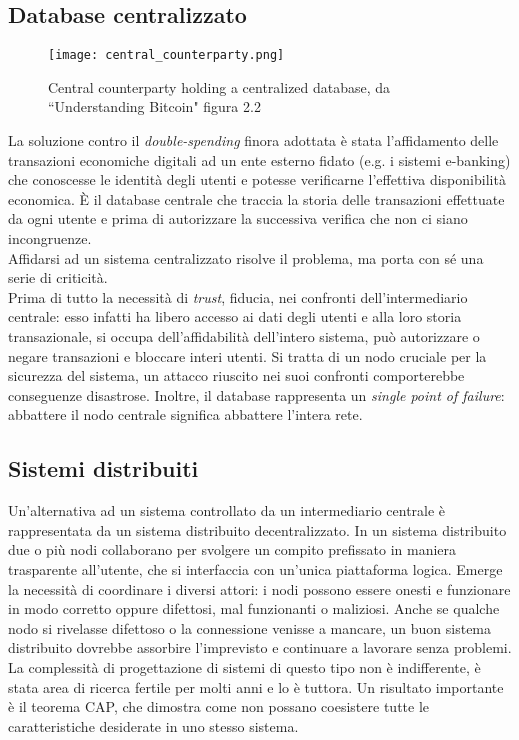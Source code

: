 	\subsection{Database centralizzato}
		\begin{figure}[ht]
			\centering
			\texttt{[image: central\_counterparty.png]}
			\caption{Central counterparty holding a centralized database, da ``Understanding Bitcoin" \cite{understanding_bitcoin} figura 2.2}
			\label{fig:central_counterparty_img}
		\end{figure}
		La soluzione contro il \emph{double-spending} finora adottata è stata l'affidamento delle transazioni economiche digitali ad un ente esterno fidato (e.g. i sistemi e-banking) che conoscesse le identità degli utenti e potesse verificarne l'effettiva disponibilità economica. È il database centrale che traccia la storia delle transazioni effettuate da ogni utente e prima di autorizzare la successiva verifica che non ci siano incongruenze. \\
		Affidarsi ad un sistema centralizzato risolve il problema, ma porta con sé una serie di criticità. \\
		Prima di tutto la necessità di \emph{trust}, fiducia, nei confronti dell'intermediario centrale: esso infatti ha libero accesso ai dati degli utenti e alla loro storia transazionale, si occupa dell'affidabilità dell'intero sistema, può autorizzare o negare transazioni e bloccare interi utenti. Si tratta di un nodo cruciale per la sicurezza del sistema, un attacco riuscito nei suoi confronti comporterebbe conseguenze disastrose. Inoltre, il database rappresenta un \emph{single point of failure}: abbattere il nodo centrale significa abbattere l'intera rete.

	\subsection{Sistemi distribuiti}
		Un'alternativa ad un sistema controllato da un intermediario centrale è rappresentata da un sistema distribuito decentralizzato. In un sistema distribuito due o più nodi collaborano per svolgere un compito prefissato in maniera trasparente all'utente, che si interfaccia con un'unica piattaforma logica. Emerge la necessità di coordinare i diversi attori: i nodi possono essere onesti e funzionare in modo corretto oppure difettosi, mal funzionanti o maliziosi. Anche se qualche nodo si rivelasse difettoso o la connessione venisse a mancare, un buon sistema distribuito dovrebbe assorbire l'imprevisto e continuare a lavorare senza problemi. La complessità di progettazione di sistemi di questo tipo non è indifferente, è stata area di ricerca fertile per molti anni e lo è tuttora. Un risultato importante è il teorema CAP, che dimostra come non possano coesistere tutte le caratteristiche desiderate in uno stesso sistema.

